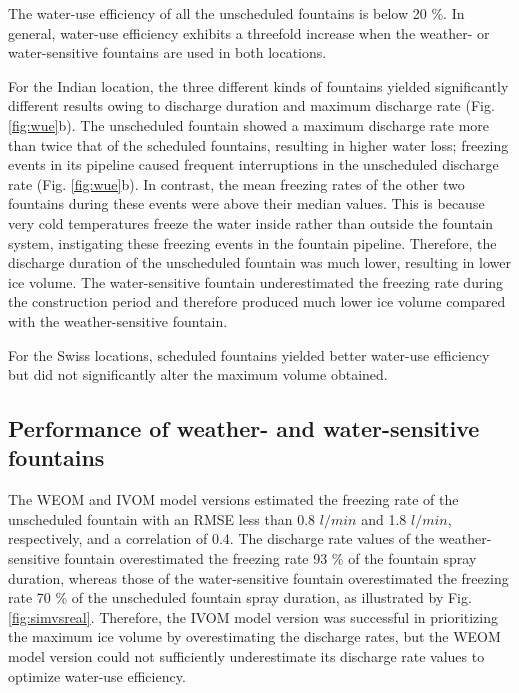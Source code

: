 \documentclass[tc, manuscript]{copernicus}
\begin{document}
The water-use efficiency of all the unscheduled fountains is below 20 \%. In general, water-use efficiency
exhibits a threefold increase when the weather- or water-sensitive fountains are used in both
locations.  

For the Indian location, the three different kinds of fountains yielded significantly different results owing to
discharge duration and maximum discharge rate (Fig. \ref{fig:wue}b). The unscheduled fountain showed a maximum
discharge rate more than twice that of the scheduled fountains, resulting in higher water loss; freezing events
in its pipeline caused frequent interruptions in the unscheduled discharge rate (Fig. \ref{fig:wue}b). In
contrast, the mean freezing rates of the other two fountains during these events were above their median values.
This is because very cold temperatures freeze the water inside rather than outside the fountain system,
instigating these freezing events in the fountain pipeline. Therefore, the discharge duration of the unscheduled
fountain was much lower, resulting in lower ice volume. The water-sensitive fountain underestimated the freezing
rate during the construction period and therefore produced much lower ice volume compared with the
weather-sensitive fountain. 

For the Swiss locations, scheduled fountains yielded better water-use efficiency but did not significantly alter the maximum
volume obtained. 

\subsection{Performance of weather- and water-sensitive fountains}

The WEOM and IVOM model versions estimated the freezing rate of the unscheduled fountain with an RMSE less than
0.8 $l/min$ and 1.8 $l/min$, respectively, and a correlation of 0.4. The discharge rate values of the
weather-sensitive fountain overestimated the freezing rate 93 \% of the fountain spray duration, whereas those
of the water-sensitive fountain overestimated the freezing rate 70 \% of the unscheduled fountain spray
duration, as illustrated by Fig. \ref{fig:simvsreal}. Therefore, the IVOM model version was successful in
prioritizing the maximum ice volume by overestimating the discharge rates, but the WEOM model version could not
sufficiently underestimate its discharge rate values to optimize water-use efficiency.
\end{document}
